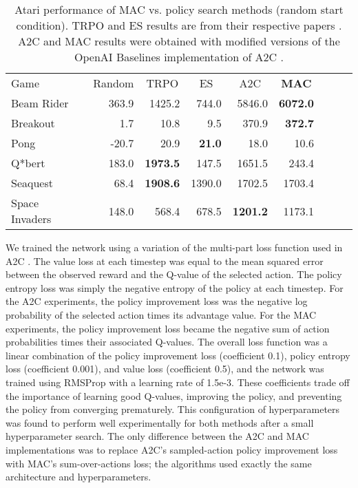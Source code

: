 \documentclass[letterpaper]{article}
\begin{document}
\begin{table*}[t]
\centering
\begin{tabular}{lrrrrrrrr}
    \toprule
Game           & \multicolumn{1}{c}{Random} & \multicolumn{1}{c}{TRPO} & \multicolumn{1}{c}{ES} & \multicolumn{1}{c}{A2C} & \multicolumn{1}{c}{\textbf{MAC}} \\
\cmidrule{1-6}
Beam Rider     & 363.9  & 1425.2          & 744.0         & 5846.0          & \textbf{6072.0} \\
Breakout       & 1.7    & 10.8            & 9.5           & 370.9           & \textbf{372.7} \\
Pong           & -20.7  & 20.9            & \textbf{21.0} & 18.0            & 10.6 \\
Q*bert         & 183.0  & \textbf{1973.5} & 147.5         & 1651.5          & 243.4 \\
Seaquest       & 68.4   & \textbf{1908.6} & 1390.0        & 1702.5          & 1703.4 \\
Space Invaders & 148.0  & 568.4           & 678.5         & \textbf{1201.2} & 1173.1 \\
   \bottomrule
\end{tabular}
\caption{Atari performance of MAC vs. policy search methods (random start condition). TRPO and ES results are from their respective papers \cite{schulman2015trust,salimans2017evolution}. A2C and MAC results were obtained with modified versions of the OpenAI Baselines implementation of A2C \cite{wu2017scalable}.}
\label{tbl:atari_random_start}
\end{table*}

We trained the network using a variation of the multi-part loss function used in A2C \cite{wu2017scalable}. The value loss at each timestep was equal to the mean squared error between the observed reward and the Q-value of the selected action. The policy entropy loss was simply the negative entropy of the policy at each timestep. For the A2C experiments, the policy improvement loss was the negative log probability of the selected action times its advantage value. For the MAC experiments, the policy improvement loss became the negative sum of action probabilities times their associated Q-values. The overall loss function was a linear combination of the policy improvement loss (coefficient 0.1), policy entropy loss (coefficient 0.001), and value loss (coefficient 0.5), and the network was trained using RMSProp with a learning rate of 1.5e-3. These coefficients trade off the importance of learning good Q-values, improving the policy, and preventing the policy from converging prematurely. This configuration of hyperparameters was found to perform well experimentally for both methods after a small hyperparameter search. The only difference between the A2C and MAC implementations was to replace A2C's sampled-action policy improvement loss with MAC's sum-over-actions loss; the algorithms used exactly the same architecture and hyperparameters.
\end{document}
